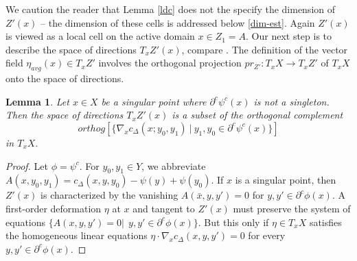 \documentclass[12pt]{amsart}
\newtheorem{lem}{Lemma}
\theoremstyle{definition}
\theoremstyle{remark}
\newcommand{\del}{\partial}
\newcommand{\cd}{c_\Delta}
\begin{document}





















We caution the reader that Lemma \ref{ldc} does not the specify the dimension of $Z'(x)$ -- the dimension of these cells is addressed below \ref{dim-est}. Again $Z'(x)$ is viewed as a local cell on the active domain $x\in Z_1=A$. Our next step is to describe the space of directions $T_x Z'(x)$, compare \cite[Def.10.4.6, pp.257]{Vil1}. The definition of the vector field $\eta_{avg}(x) \in T_x Z'$ involves the orthogonal projection $pr_{Z'}:T_x X \to T_x Z'$ of $T_xX$ onto the space of directions. 


\begin{lem}\label{orthog}
Let $x\in X$ be a singular point where $\del^c \psi^c(x)$ is not a singleton.  Then the space of directions $T_x Z'(x)$  is a subset of the orthogonal complement  $$orthog[\{\nabla_x \cd(x; y_0, y_1)~ |~ y_1,y_0 \in \del^c \psi^c (x) \}]$$ in $ T_x X.$ 
\end{lem}
\begin{proof}
Let $\phi=\psi^c$. For $y_0, y_1 \in Y$, we abbreviate $A(x,y_0,y_1)=\cd(x,y,y_0)-\psi(y)+\psi(y_0)$. If $x$ is a singular point, then $Z'(x)$ is characterized by the vanishing $A(\bar{x}, y, y')=0$ for $y,y'\in \del^c \phi(x)$. A first-order deformation $\eta$ at $x$ and tangent to $Z'(x)$ must preserve the system of equations $\{A(x,y,y')=0 | ~~ y, y' \in \del^c \phi (x)\}$. But this only if $\eta \in T_x X$ satisfies the homogeneous linear equations $\eta \cdot \nabla_x \cd(x, y, y')=0$ for every $y, y'\in \del^c \phi(x)$. 
\end{proof}
\end{document}
